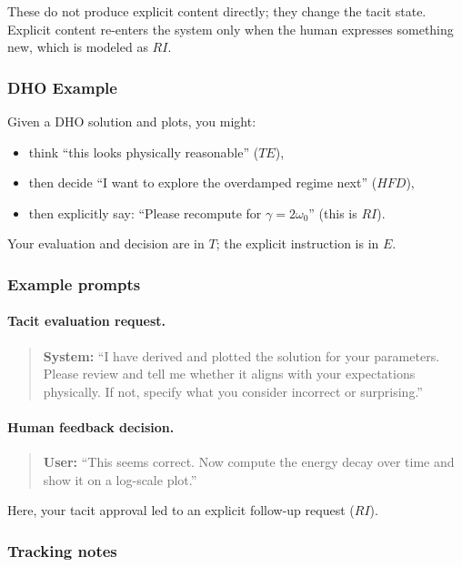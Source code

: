 These do not produce explicit content directly; they change the tacit state. 
Explicit content re-enters the system only when the human expresses something new, which is modeled
as $RI$.

\subsubsection*{DHO Example}

Given a DHO solution and plots, you might:

\begin{itemize}
 \item think ``this looks physically reasonable'' ($TE$),
 \item then decide ``I want to explore the overdamped regime next'' ($HFD$),
 \item then explicitly say: ``Please recompute for $\gamma = 2\omega_0$'' (this is $RI$).
\end{itemize}

Your evaluation and decision are in $T$; the explicit instruction is in $E$.

\subsubsection*{Example prompts}

\paragraph{Tacit evaluation request.}
\begin{quote}
\textbf{System:} 
``I have derived and plotted the solution for your parameters. 
Please review and tell me whether it aligns with your expectations physically. If not, specify what you consider incorrect or surprising.'' 
\end{quote}

\paragraph{Human feedback decision.}
\begin{quote}
\textbf{User:} 
``This seems correct. Now compute the energy decay over time and show it on a log-scale plot.'' 
\end{quote}

Here, your tacit approval led to an explicit follow-up request ($RI$).

\subsubsection*{Tracking notes}

